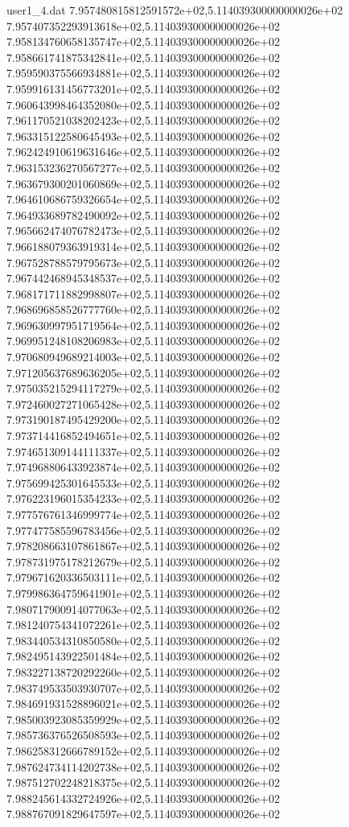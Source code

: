 \begin{filecontents}{user1_4.dat}
7.957480815812591572e+02,5.114039300000000026e+02
7.957407352293913618e+02,5.114039300000000026e+02
7.958134760658135747e+02,5.114039300000000026e+02
7.958661741875342841e+02,5.114039300000000026e+02
7.959590375566934881e+02,5.114039300000000026e+02
7.959916131456773201e+02,5.114039300000000026e+02
7.960643998464352080e+02,5.114039300000000026e+02
7.961170521038202423e+02,5.114039300000000026e+02
7.963315122580645493e+02,5.114039300000000026e+02
7.962424910619631646e+02,5.114039300000000026e+02
7.963153236270567277e+02,5.114039300000000026e+02
7.963679300201060869e+02,5.114039300000000026e+02
7.964610686759326654e+02,5.114039300000000026e+02
7.964933689782490092e+02,5.114039300000000026e+02
7.965662474076782473e+02,5.114039300000000026e+02
7.966188079363919314e+02,5.114039300000000026e+02
7.967528788579795673e+02,5.114039300000000026e+02
7.967442468945348537e+02,5.114039300000000026e+02
7.968171711882998807e+02,5.114039300000000026e+02
7.968696858526777760e+02,5.114039300000000026e+02
7.969630997951719564e+02,5.114039300000000026e+02
7.969951248108206983e+02,5.114039300000000026e+02
7.970680949689214003e+02,5.114039300000000026e+02
7.971205637689636205e+02,5.114039300000000026e+02
7.975035215294117279e+02,5.114039300000000026e+02
7.972460027271065428e+02,5.114039300000000026e+02
7.973190187495429200e+02,5.114039300000000026e+02
7.973714416852494651e+02,5.114039300000000026e+02
7.974651309144111337e+02,5.114039300000000026e+02
7.974968806433923874e+02,5.114039300000000026e+02
7.975699425301645533e+02,5.114039300000000026e+02
7.976223196015354233e+02,5.114039300000000026e+02
7.977576761346999774e+02,5.114039300000000026e+02
7.977477585596783456e+02,5.114039300000000026e+02
7.978208663107861867e+02,5.114039300000000026e+02
7.978731975178212679e+02,5.114039300000000026e+02
7.979671620336503111e+02,5.114039300000000026e+02
7.979986364759641901e+02,5.114039300000000026e+02
7.980717900914077063e+02,5.114039300000000026e+02
7.981240754341072261e+02,5.114039300000000026e+02
7.983440534310850580e+02,5.114039300000000026e+02
7.982495143922501484e+02,5.114039300000000026e+02
7.983227138720292260e+02,5.114039300000000026e+02
7.983749533503930707e+02,5.114039300000000026e+02
7.984691931528896021e+02,5.114039300000000026e+02
7.985003923085359929e+02,5.114039300000000026e+02
7.985736376526508593e+02,5.114039300000000026e+02
7.986258312666789152e+02,5.114039300000000026e+02
7.987624734114202738e+02,5.114039300000000026e+02
7.987512702248218375e+02,5.114039300000000026e+02
7.988245614332724926e+02,5.114039300000000026e+02
7.988767091829647597e+02,5.114039300000000026e+02

\end{filecontents}
